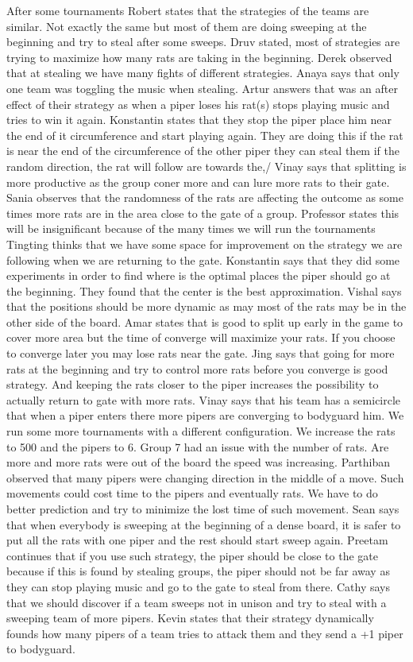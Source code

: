 After some tournaments Robert states that the strategies of the teams are similar. Not exactly the same but most of them are doing sweeping at the beginning and try to steal after some sweeps. 
Druv stated, most of strategies are trying to maximize how many rats are taking in the beginning.
Derek observed that at stealing we have many fights of different strategies.
Anaya says that only one team was toggling the music when stealing.
Artur answers that was an after effect of their strategy as when a piper loses his rat(s) stops playing music and tries to win it again.
Konstantin states that they stop the piper place him near the end of it circumference and start playing again. They are doing this if the rat is near the end of the circumference of the other piper they can steal them if the random direction, the rat will follow are towards the,/
Vinay says that splitting is more productive as the group coner more and can lure more rats to their gate.
Sania observes that the randomness of the rats are affecting the outcome as some times more rats are in the area close to the gate of a group.
Professor states this will be insignificant because of the many times we will run the tournaments
Tingting thinks that we have some space for improvement on the strategy we are following when we are returning to the gate.
Konstantin says that they did some experiments in order to find where is the optimal places the piper should go at the beginning. They found that the center is the best approximation.
Vishal says that the positions should be more dynamic as may most of the rats may be in the other side of the board.
Amar states that is good to split up early in the game to cover more area but the time of converge will maximize your rats. If you choose to converge later you may lose rats near the gate. 
Jing says that going for more rats at the beginning and try to control more rats before you converge is good strategy. And keeping the rats closer to the piper increases the possibility to actually return to gate with more rats.
Vinay says that his team has a semicircle that when a piper enters there more pipers are converging to bodyguard him.
We run some more tournaments with a different configuration. We increase the rats to 500 and the pipers to 6. Group 7 had an issue with the number of rats. Are more and more rats were out of the board the speed was increasing. 
Parthiban observed that many pipers were changing direction in the middle of a move. Such movements could cost time to the pipers and eventually rats. We have to do better prediction and try to minimize the lost time of such movement.
Sean says that when everybody is sweeping at the beginning of a dense board, it is safer to put all the rats with one piper and the rest should start sweep again.
Preetam continues that if you use such strategy, the piper should be close to the gate because if this is found by stealing groups, the piper should not be far away as they can stop playing music and go to the gate to steal from there.
Cathy says that we should discover if a team sweeps not in unison and try to steal with a sweeping team of more pipers.
Kevin states that their strategy dynamically founds how many pipers of a team tries to attack them and they send a +1 piper to bodyguard.


